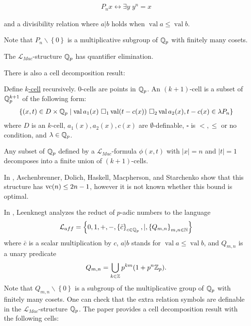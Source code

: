 \documentclass{amsart}
\renewcommand{\LL}{\mathcal L}
\newcommand{\LLM}{\mathcal L_{Mac}}
\newcommand{\curly}[1]{\left\{#1\right\}}
\DeclareMathOperator{\vval}{val}
\newcommand{\defn}{\underline}
\begin{document}
\begin{align*}
  P_n x \leftrightarrow \exists y \; y^n = x
\end{align*}

and a divisibility relation where $a|b$ holds when $\vval a \leq \vval b$.

Note that $P_n\backslash \curly{0}$ is a multiplicative subgroup of $\mathbb{Q}_p$ with finitely many cosets.

\begin{Theorem} [Macintyre '76]
  The $\LLM$-structure $\mathbb{Q}_p$ has quantifier elimination.
\end{Theorem}

There is also a cell decomposition result:
\begin{Definition}
  Define \defn{$k$-cell} recursively.
  $0$-cells are points in $\mathbb{Q}_p$.
  An $(k+1)$-cell is a subset of $\mathbb{Q}_p^{k+1}$ of the following form:
  \begin{align*}
    \curly{(x, t) \in D \times \Q_p \mid \vval a_1(x) \ \square_1 \vval (t - c(x)) \ \square_2 \vval a_2(x), t - c(x) \in \lambda P_n}
  \end{align*}
  where $D$ is an $k$-cell,
  $a_1(x), a_2(x), c(x)$ are $\emptyset$-definable,
  $\square$ is $<, \leq$ or no condition, and
  $\lambda \in \mathbb{Q}_p$.    
\end{Definition}

\begin{Theorem} [Denef '84]
  Any subset of $\mathbb{Q}_p$ defined by a $\LLM$-formula $\phi(x, t)$ with $|x| = n$ and $|t| = 1$ decomposes into a finite union of $(k+1)$-cells.
\end{Theorem}  

In \cite{density}, Aschenbrenner, Dolich, Haskell, Macpherson, and Starchenko show that this structure has $\operatorname{vc}(n) \leq 2n - 1$,
however it is not known whether this bound is optimal.

In \cite{reduct}, Leenknegt analyzes the reduct of $p$-adic numbers to the language
\begin{align*}
  \LL_{aff}  = \curly{0, 1, +, -, \curly{\bar c}_{c \in \Q_p}, |, \curly{Q_{m,n}}_{m,n\in \N}}
\end{align*}
where $\bar c$ is a scalar multiplication by $c$,
$a | b$ stands for $\vval a \leq \vval b$,
and $Q_{m,n}$ is a unary predicate
\begin{align*}
  Q_{m,n} = \bigcup_{k \in \mathbb{Z}} p^{km} (1 + p^n\mathbb{Z}_p).
\end{align*}
Note that $Q_{m,n} \backslash \curly{0}$ is a subgroup of the multiplicative group of $\mathbb{Q}_p$ with finitely many cosets.
One can check that the extra relation symbols are definable in the $\LLM$-structure $\mathbb{Q}_p$.
The paper \cite{reduct} provides a cell decomposition result with the following cells:
\end{document}
